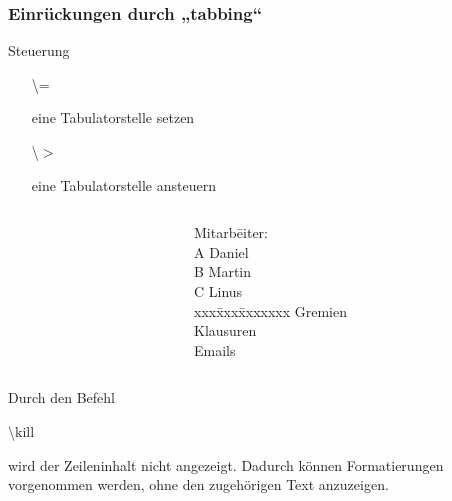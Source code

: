\begin{frame}
\frametitle{Einrückungen durch „tabbing“}
\begin{block}{Steuerung}
\begin{itemize}
\item[\begin{ttfamily}\color{nounibaredI}\textbackslash =\end{ttfamily}]\color{black}eine Tabulatorstelle setzen 
\item[\begin{ttfamily}\color{nounibaredI}\textbackslash $>$\end{ttfamily}]eine Tabulatorstelle ansteuern
\end{itemize}
\end{block}

\begin{columns}
\begin{column}{.5\textwidth}
\begin{ttfamily}{\scriptsize
}
\end{ttfamily}
\end{column}
\begin{column}{.5\textwidth}
\begin{tabbing}
Mitarb\=eiter:\\
A  \> Daniel\\
B  \> Martin\\
C  \> Linus\\
xxx\=xxx\=xxxxxxx\kill
\> Gremien\\
\>\> Klausuren\\
\>\> Emails\\
\end{tabbing}
\end{column}
\end{columns}

Durch den Befehl\begin{ttfamily} \color{nounibaredI}\textbackslash kill\color{black}\end{ttfamily} wird der Zeileninhalt nicht angezeigt. Dadurch können Formatierungen vorgenommen werden, ohne den zugehörigen Text anzuzeigen.
\end{frame}
